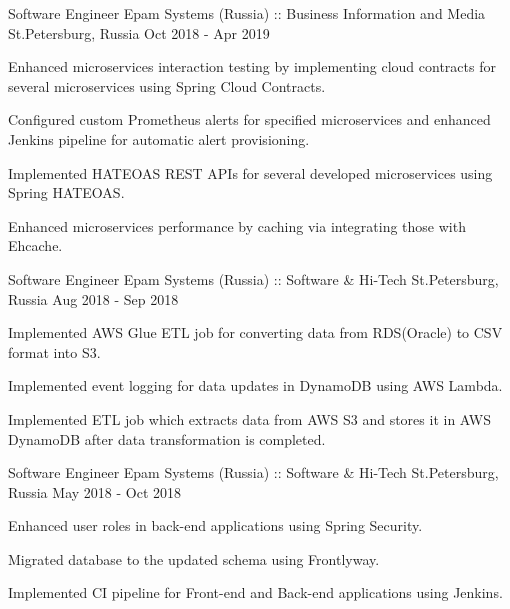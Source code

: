 \begin{cventries}
\cventry
{Software Engineer} %
{Epam Systems (Russia) :: Business Information and Media} %
{St.Petersburg, Russia} %
{Oct 2018 - Apr 2019} %
{
  \begin{cvitems} %
    \item {Enhanced microservices interaction testing by implementing cloud contracts for several microservices using Spring Cloud Contracts.}
    \item {Configured custom Prometheus alerts for specified microservices and enhanced Jenkins pipeline for automatic alert provisioning.}
    \item {Implemented HATEOAS  REST APIs for several developed microservices using Spring HATEOAS.}
    \item {Enhanced microservices performance by caching via integrating those with Ehcache.}
  \end{cvitems}
}

\cventry
{Software Engineer} %
{Epam Systems (Russia) :: Software \& Hi-Tech} %
{St.Petersburg, Russia} %
{Aug 2018 - Sep 2018} %
{
  \begin{cvitems} %
    \item {Implemented AWS Glue ETL job for converting data from RDS(Oracle) to CSV format into S3.}
    \item {Implemented event logging for data updates in DynamoDB using AWS Lambda.}
    \item {Implemented ETL job which extracts data from AWS S3 and stores it in AWS DynamoDB after data transformation is completed.}
  \end{cvitems}
}

\cventry
{Software Engineer} %
{Epam Systems (Russia) :: Software \& Hi-Tech} %
{St.Petersburg, Russia} %
{May 2018 - Oct 2018} %
{
  \begin{cvitems} %
    \item {Enhanced user roles in back-end applications using Spring Security.}
    \item {Migrated database to the updated schema using Frontlyway.}
    \item {Implemented CI pipeline for Front-end and Back-end applications using Jenkins.}
  \end{cvitems}
}

\end{cventries}
